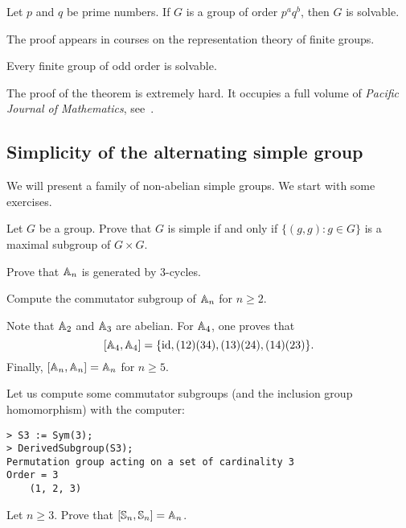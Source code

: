 \begin{theorem}[Burnside]
    Let $p$ and $q$ be prime numbers. If $G$ is a group
    of order $p^aq^b$, then $G$ is solvable. 
\end{theorem}

The proof appears in courses on the 
representation theory of finite groups. 

\begin{theorem}
    Every finite group of odd order is solvable.
\end{theorem}

The proof of the theorem is extremely hard. It occupies a full volume of
\emph{Pacific Journal of Mathematics}, see~\cite{MR166261}.



\subsection{Simplicity of the alternating simple group}

We will present a family of non-abelian simple groups. 
We start with some exercises. 

\begin{exercise}
\label{xca:diagonal}
    Let $G$ be a group. 
    Prove that $G$ is simple if and only if 
    $\{(g,g):g\in G\}$ 
    is a maximal subgroup of $G\times G$. 
\end{exercise}

\begin{exercise}
    Prove that $\mathbb{A}_n$ is generated by 3-cycles. 
\end{exercise}

\begin{exercise}
    Compute the commutator subgroup of $\mathbb{A}_n$ for
    $n\geq2$. 
\end{exercise}

Note that $\mathbb{A}_2$ and $\mathbb{A}_3$ are abelian. 
For $\mathbb{A}_4$, one proves that 
\[
[\mathbb{A}_4,\mathbb{A}_4]=\{\operatorname{id},(12)(34),(13)(24),(14)(23)\}.
\]
Finally, $[\mathbb{A}_n,\mathbb{A}_n]=\mathbb{A}_n$ for $n\geq5$. 

Let us compute some commutator subgroups (and the inclusion group homomorphism)  
with the computer:
\begin{lstlisting}
> S3 := Sym(3);
> DerivedSubgroup(S3);
Permutation group acting on a set of cardinality 3
Order = 3
    (1, 2, 3)   
\end{lstlisting}

\begin{exercise}
    Let $n\geq3$. 
    Prove that $[\mathbb{S}_n,\mathbb{S}_n]=\mathbb{A}_n$. 
\end{exercise}

